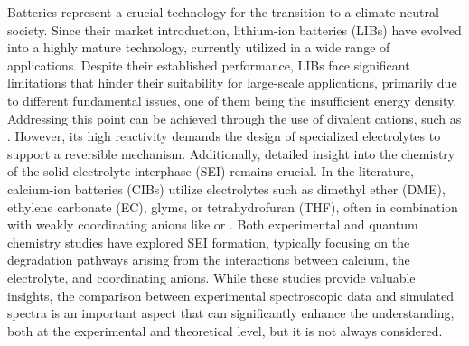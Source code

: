 \documentclass[journal=jpccck,manuscript=article]{achemso}
\begin{document}
Batteries represent a crucial technology for the transition to a climate-neutral society. Since their market introduction, lithium-ion batteries (LIBs) have evolved into a highly mature technology, currently utilized in a wide range of applications.\cite{zubiLithiumionBatteryState2018,kimLithiumionBatteriesOutlook2019} Despite their established performance, LIBs face significant limitations that hinder their suitability for large-scale applications, primarily due to different fundamental issues, one of them being the insufficient energy density.\cite{luReviewKeyIssues2013,li30YearsLithiumIon2018} Addressing this point can be achieved through the use of divalent cations, such as .\cite{arroyo-dedompabloAchievementsChallengesProspects2020,taghavi-kahaghPoweringFutureComprehensive2024} However, its high reactivity demands the design of specialized electrolytes to support a reversible mechanism. Additionally, detailed insight into the chemistry of the solid-electrolyte interphase (SEI) remains crucial.\cite{melemedImpactDifferentialCa22023,zhaoRevealingSolidElectrolyte2022}
In the literature, calcium-ion batteries (CIBs) utilize electrolytes such as dimethyl ether (DME), ethylene carbonate (EC), glyme, or tetrahydrofuran (THF), often in combination with weakly coordinating anions like  or  \cite{songElectrolyteOptimizationInterphase2022,zhaoRevealingSolidElectrolyte2022,bodinBoronBasedFunctionalAdditives2023}. 
Both experimental \cite{songElectrolyteOptimizationInterphase2022,melemedImpactDifferentialCa22023,bodinBoronBasedFunctionalAdditives2023} and quantum chemistry studies \cite{hahnCriticalRoleConfigurational2020,liepinyaComputationalComparisonEther2021,yamijalaStabilityCalciumIon2021} have explored SEI formation, typically focusing on the degradation pathways arising from the interactions between calcium, the electrolyte, and coordinating anions\cite{wuUnderstandingSolidElectrolyte2021,bodinBoronBasedFunctionalAdditives2023}. While these studies provide valuable insights, the comparison between experimental spectroscopic data and simulated spectra is an important aspect that can significantly enhance the understanding, both at the experimental and theoretical level, but it is not always considered.
\end{document}
